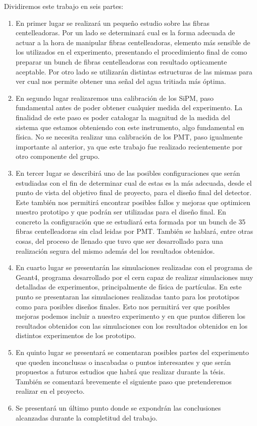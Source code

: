 
Dividiremos este trabajo en seis partes:
\begin{enumerate}
\item{} En primer lugar se realizará un pequeño estudio sobre las fibras centelleadoras. Por un lado se determinará cual es la forma adecuada de actuar a la hora de manipular fibras centelleadoras, elemento más sensible de los utilizados en el experimento, presentando el procedimiento final de como preparar un bunch de fibras centelleadoras con resultado opticamente aceptable. Por otro lado se utilizarán distintas estructuras de las mismas para ver cual nos permite obtener una señal del agua tritiada  más óptima. 

\item{} En segundo lugar realizaremos una calibración de los SiPM, paso fundamental antes de poder obtener cualquier medida del experimento. La finalidad de este paso es poder catalogar la magnitud de la medida del sistema que estamos obteniendo con este instrumento, algo fundamental en física. No se necesita realizar una calibración de los PMT, paso igualmente importante al anterior, ya que este trabajo fue realizado recientemente por otro componente del grupo.

\item{} En tercer lugar se describirá uno de las posibles configuraciones que serán estudiadas con el fin de determinar cual de estas es la más adecuada, desde el punto de vista del objetivo final de proyecto, para el diseño final del detector. Este también nos permitirá encontrar posibles fallos y mejoras que optimicen nuestro prototipo y que podrán ser utilizadas para el diseño final. En concreto la configuración que se estudiará esta formada por un bunch de 35 fibras centelleadoras sin clad leidas por PMT. También se hablará, entre otras cosas, del proceso de llenado que tuvo que ser desarrollado para una realización segura del mismo además del los resultados obtenidos.

\item{} En cuarto lugar se presentarán las simulaciones realizadas con el programa de Geant4, programa desarrollado por el cern capaz de realizar simulaciones muy detalladas de experimentos, principalmente de física de partículas. En este punto se presentaran las simulaciones realizadas tanto para los prototipos como para posibles diseños finales. Esto nos permitirá ver que posibles mejoras podemos incluir a nuestro experimento y en que puntos difieren los resultados obtenidos con las simulaciones con los resultados obtenidos en los distintos experimentos de los prototipo.

\item{} En quinto lugar se presentará se comentaran posibles partes del experimento que queden inconclusas o inacabadas o puntos interesantes y que serán propuestos a futuros estudios que habrá que realizar durante la tésis. También se comentará brevemente el siguiente paso que pretenderemos realizar en el proyecto.

\item{} Se presentará un último punto donde se expondrán las conclusiones alcanzadas durante la completitud del trabajo.

\end{enumerate}